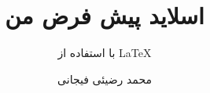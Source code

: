 \documentclass[xcolor=dvipsnames, professionalfont]{beamer}
\author{محمد رضیئی فیجانی}
\title{ اسلاید پیش فرض من }
\subtitle{با استفاده از \LaTeX}
\institute{دانشگاه صنعتی امیرکبیر}
\begin{document}
\frame{\maketitle}
\begin{frame}


\end{frame}
\end{document}
